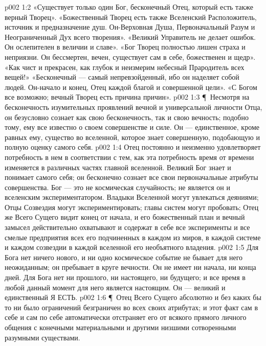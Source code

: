 \vs p002 1:2 «Существует только один Бог, бесконечный Отец, который есть также верный Творец». «Божественный Творец есть также Вселенский Расположитель, источник и предназначение душ. Он\hyp{}Верховная Душа, Первоначальный Разум и Неограниченный Дух всего творения». «Великий Управитель не делает ошибок. Он ослепителен в величии и славе». «Бог Творец полностью лишен страха и неприязни. Он бессмертен, вечен, существует сам в себе, божественен и щедр». «Как чист и прекрасен, как глубок и неизмерим небесный Прародитель всех вещей!» «Бесконечный --- самый непревзойденный, ибо он наделяет собой людей. Он\hyp{}начало и конец, Отец каждой благой и совершенной цели». «С Богом все возможно; вечный Творец есть причина причин».
\vs p002 1:3 \P\ Несмотря на бесконечность изумительных проявлений вечной и универсальной личности Отца, он безусловно сознает как свою бесконечность, так и свою вечность; подобно тому, ему все известно о своем совершенстве и силе. Он --- единственное, кроме равных ему, существо во вселенной, которое знает совершенную, подобающую и полную оценку самого себя.
\vs p002 1:4 Отец постоянно и неизменно удовлетворяет потребность в нем в соответствии с тем, как эта потребность время от времени изменяется в различных частях главной вселенной. Великий Бог знает и понимает самого себя; он бесконечно сознает все свои первоначальные атрибуты совершенства. Бог --- это не космическая случайность; не является он и вселенским экспериментатором. Владыки Вселенной могут увлекаться деяниями; Отцы Созвездия могут экспериментировать; главы систем могут пробовать; Отец же Всего Сущего видит конец от начала, и его божественный план и вечный замысел действительно охватывают и содержат в себе все эксперименты и все смелые предприятия всех его подчиненных в каждом из миров, в каждой системе и каждом созвездии в каждой вселенной его необъятного владения.
\vs p002 1:5 Для Бога нет ничего нового, и ни одно космическое событие не бывает для него неожиданным; он пребывает в круге вечности. Он не имеет ни начала, ни конца дней. Для Бога нет ни прошлого, ни настоящего, ни будущего; и все время в любой данный момент для него является настоящим. Он --- великий и единственный Я ЕСТЬ.
\vs p002 1:6 \P\ Отец Всего Сущего абсолютно и без каких бы то ни было ограничений безграничен во всех своих атрибутах; и этот факт сам в себе и сам по себе автоматически отстраняет его от всякого прямого личного общения с конечными материальными и другими низшими сотворенными разумными существами.
